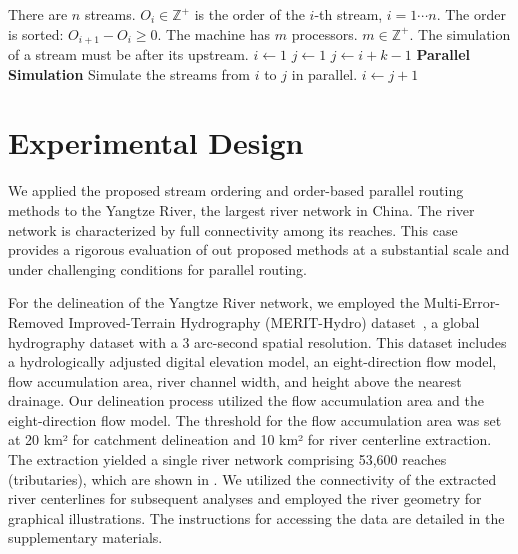\documentclass[water,article,submit,pdftex,moreauthors]{Definitions/mdpi}
\begin{document}
\begin{algorithm}
    \caption{A shared-memory parallel execution machine of river network routing.}
    \label{alg:shared_memory}
    \begin{algorithmic}
        \REQUIRE There are $n$ streams. $O_i \in \mathbb{Z}^{+}$ is the order of the $i$-th stream, $i = 1\cdots{}n$. The order is sorted: $O_{i+1} - O_i \ge 0$.
        \REQUIRE The machine has $m$ processors. $m \in \mathbb{Z}^{+}$.
        \ENSURE The simulation of a stream must be after its upstream.
        \STATE $i \gets 1$ 
        \STATE $j \gets 1$ 
        \STATE $j \gets i + k - 1$
        \ENDIF
        \ENDFOR
        \STATE \textbf{Parallel Simulation} Simulate the streams from $i$ to $j$ in parallel.
        \STATE $i \gets j + 1$
        \ENDWHILE
    \end{algorithmic}
\end{algorithm}

\section{Experimental Design}
\label{sec:domain}

We applied the proposed stream ordering and order-based parallel routing methods to the Yangtze River, the largest river network in China. The river network is characterized by full connectivity among its reaches. This case provides a rigorous evaluation of out proposed methods at a substantial scale and under challenging conditions for parallel routing.

For the delineation of the Yangtze River network, we employed the Multi-Error-Removed Improved-Terrain Hydrography (MERIT-Hydro) dataset~\cite{yamazaki2017GRL, yamazaki2019WRR}, a global hydrography dataset with a 3 arc-second spatial resolution. This dataset includes a hydrologically adjusted digital elevation model, an eight-direction flow model, flow accumulation area, river channel width, and height above the nearest drainage. Our delineation process utilized the flow accumulation area and the eight-direction flow model. The threshold for the flow accumulation area was set at 20 km² for catchment delineation and 10 km² for river centerline extraction. The extraction yielded a single river network comprising 53,600 reaches (tributaries), which are shown in . We utilized the connectivity of the extracted river centerlines for subsequent analyses and employed the river geometry for graphical illustrations. The instructions for accessing the data are detailed in the supplementary materials.
\end{document}
